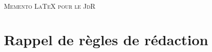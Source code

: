 \documentclass[11pt,twoside,a4paper]{article}
\begin{document}
\begin{landscape}


\begin{multicols}{2}

	\textsc{\Huge Memento LaTeX pour le JdR}~\\
	
	\tableofcontents
	
	
	
	\section{Rappel de règles de rédaction}
	

\end{multicols}
\end{landscape}
\end{document}
